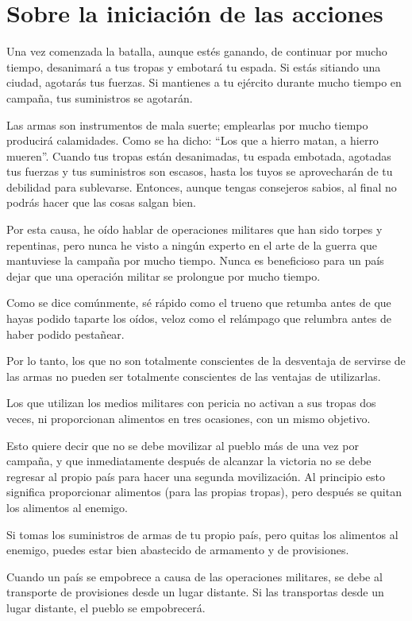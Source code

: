 \chapter{Sobre la iniciación de las acciones}

Una vez comenzada la batalla, aunque estés ganando, de continuar por mucho tiempo, desanimará a tus tropas y embotará tu espada. Si estás sitiando una ciudad, agotarás tus fuerzas. Si mantienes a tu ejército durante mucho tiempo en campaña, tus suministros se agotarán.

Las armas son instrumentos de mala suerte; emplearlas por mucho tiempo producirá calamidades. Como se ha dicho: ``Los que a hierro matan, a hierro mueren''. Cuando tus tropas están desanimadas, tu espada embotada, agotadas tus fuerzas y tus suministros son escasos, hasta los tuyos se aprovecharán de tu debilidad para sublevarse. Entonces, aunque tengas consejeros sabios, al final no podrás hacer que las cosas salgan bien.

Por esta causa, he oído hablar de operaciones militares que han sido torpes y repentinas, pero nunca he visto a ningún experto en el arte de la guerra que mantuviese la campaña por mucho tiempo. Nunca es beneficioso para un país dejar que una operación militar se prolongue por mucho tiempo.

Como se dice comúnmente, sé rápido como el trueno que retumba antes de que hayas podido taparte los oídos, veloz como el relámpago que relumbra antes de haber podido pestañear.

Por lo tanto, los que no son totalmente conscientes de la desventaja de servirse de las armas no pueden ser totalmente conscientes de las ventajas de utilizarlas.

Los que utilizan los medios militares con pericia no activan a sus tropas dos veces, ni proporcionan alimentos en tres ocasiones, con un mismo objetivo.

Esto quiere decir que no se debe movilizar al pueblo más de una vez por campaña, y que inmediatamente después de alcanzar la victoria no se debe regresar al propio país para hacer una segunda movilización. Al principio esto significa proporcionar alimentos (para las propias tropas), pero después se quitan los alimentos al enemigo.

Si tomas los suministros de armas de tu propio país, pero quitas los alimentos al enemigo, puedes estar bien abastecido de armamento y de provisiones.

Cuando un país se empobrece a causa de las operaciones militares, se debe al transporte de provisiones desde un lugar distante. Si las transportas desde un lugar distante, el pueblo se empobrecerá.
 
